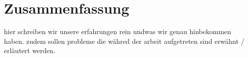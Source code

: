 \chapter{Zusammenfassung}
\begin{Spacing}{\mylinespace}

hier schreiben wir unsere erfahrungen rein undwas wir genau hinbekommen haben. zudem sollen probleme die währed der arbeit aufgetreten sind erwähnt / erläutert werden. \\

\end{Spacing}
\newpage
\clearpage
